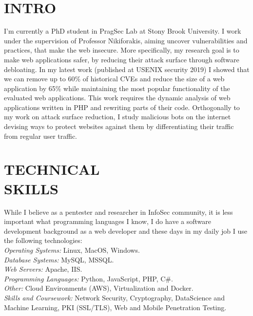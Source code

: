 \documentclass[margin, 10pt]{res} %
\begin{document}
\begin{resume}

 
\section{INTRO}  

I'm currently a PhD student in PragSec Lab at Stony Brook University. I work under the supervision of Professor Nikiforakis, aiming uncover vulnerabilities and practices, that make the web insecure. More specifically, my research goal is to make web applications safer, by reducing their attack surface through software debloating.
In my latest work (published at USENIX security 2019) I showed that we can remove up to 60\% of historical CVEs and reduce the size of a web application by 65\% while maintaining the most popular functionality of the evaluated web applications. This work requires the dynamic analysis of web applications written in PHP and rewriting parts of their code. Orthogonally to my work on attack surface reduction, I study malicious bots on the internet devising ways to protect websites against them by differentiating their traffic from regular user traffic. 


\section{TECHNICAL \\ SKILLS} 


While I believe as a pentester and researcher in InfoSec community, it is less important what programming languages I know, I do have a software development background as a web developer and these days in my daily job I use the following technologies:\\
{\sl Operating Systems:} Linux, MacOS, Windows. \\
{\sl Database Systems:} MySQL, MSSQL. \\
{\sl Web Servers:} Apache, IIS. \\
{\sl Programming Languages:} Python, JavaScript, PHP, C\#. \\
{\sl Other:} Cloud Environments (AWS), Virtualization and Docker. \\
{\sl Skills and Coursework:} Network Security, Cryptography, DataScience and Machine Learning, PKI (SSL/TLS), Web and Mobile Penetration Testing. \\
 

\end{resume}
\end{document}
